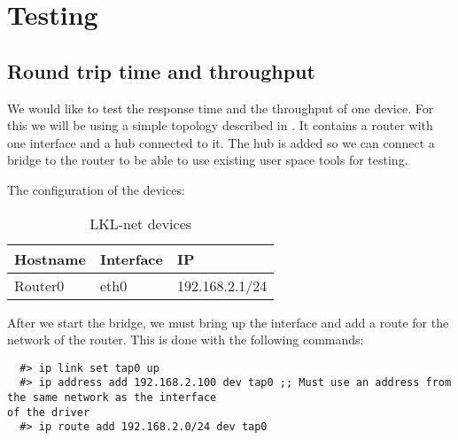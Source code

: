 \chapter{Testing}
\label{chapter:testing}

\section{Round trip time and throughput}
\label{sec:response-time}


We would like to test the response time and the throughput of one device. For this we will be using
a simple topology described in . It contains a router with one interface and
a hub connected to it. The hub is added so we can connect a bridge to the router to be able to use
existing user space tools for testing.


The configuration of the devices:

\begin{center}
  \begin{table}[htb]
  \begin{center}
  \begin{tabular}{| l | l | l |}
    \hline
      Hostname & Interface & IP  \\ \hline
      Router0 & eth0 & 192.168.2.1/24 \\ 
    \hline
  \end{tabular}
  \end{center}
  \caption{LKL-net devices}
  \label{table:tdevices}
  \end{table}
\end{center}

After we start the bridge, we must bring up the interface and add a route for the network of the
router. This is done with the following commands:

\lstset{language=zsh,caption=Configuring a TAP interface,label=lst:conf-tap}
\begin{lstlisting}
  #> ip link set tap0 up
  #> ip address add 192.168.2.100 dev tap0 ;; Must use an address from the same network as the interface
of the driver
  #> ip route add 192.168.2.0/24 dev tap0
\end{lstlisting}

